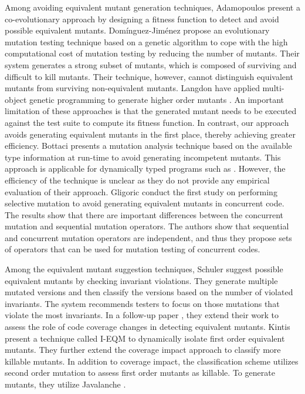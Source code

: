 Among avoiding equivalent mutant generation techniques, Adamopoulos \etal \cite{adamopoulos:gecco04} present a co-evolutionary approach by designing a fitness function to detect and avoid possible equivalent mutants.
Dom\'inguez-Jim\'enez \etal \cite{dominguez:ist11} propose an evolutionary mutation testing
technique based on a genetic algorithm to cope with the high computational cost of mutation 
testing by reducing the number of mutants. Their system generates a strong subset
of mutants, which is composed of surviving and difficult to kill mutants. 
Their technique, however, cannot distinguish equivalent mutants from surviving non-equivalent mutants.
Langdon \etal have applied multi-object genetic programming to generate higher order mutants 
\cite{langdon:jss10}.
An important limitation of these approaches is that the generated
mutant needs to be executed against the test suite to compute its fitness function.
In contrast, our approach avoids  generating equivalent mutants in the first place,
thereby achieving greater efficiency.
Bottaci \cite{bottaci:icstw10} presents a mutation analysis technique based on the available type information at run-time to avoid generating incompetent mutants. 
This approach is applicable for dynamically typed programs such as \javascript. 
However, the efficiency of the technique is unclear as they do not provide any empirical evaluation of their approach.
Gligoric \etal \cite{gligoric:issta13} conduct the first study on performing selective mutation to avoid generating equivalent mutants in concurrent code. The results show that there are important differences between the concurrent mutation and sequential mutation operators. The authors show that sequential and concurrent mutation operators are independent, and thus they propose sets of operators that can be used for mutation testing of concurrent codes. 

Among the equivalent mutant suggestion techniques, Schuler \etal \cite{schuler:issta09} suggest possible equivalent mutants by checking invariant violations. They
generate multiple mutated versions and then classify the versions based on the number of violated invariants.
The system recommends testers to focus on those mutations that violate the most invariants.
In a follow-up paper \cite{schuler:tvr12}, they extend their work to assess the role of code coverage changes in detecting equivalent mutants. 
Kintis \etal \cite{kintis:icst12} present a technique called I-EQM to dynamically isolate first order equivalent mutants. They
further extend the coverage impact approach \cite{schuler:tvr12} to classify more killable mutants.  
In addition to coverage impact, the classification scheme utilizes second order mutation to assess first order mutants as killable. 
To generate mutants, they utilize Javalanche \cite{schuler:tvr12}.

